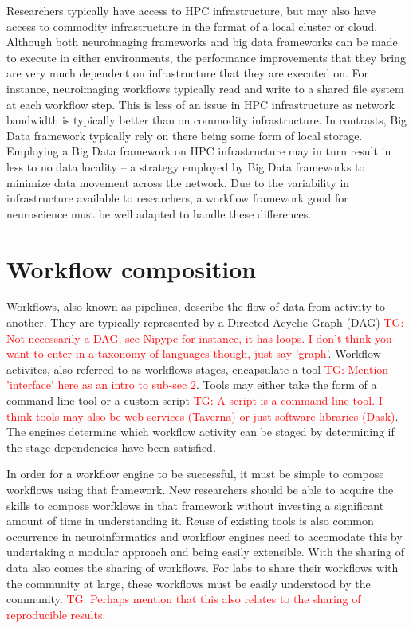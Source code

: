\documentclass{report}
\newcommand{\tristan}[1]{\textcolor{red}{TG: #1}}
\begin{document}
            Researchers typically have access to HPC infrastructure, but may
            also have access to commodity infrastructure in the format of a 
            local cluster or cloud. Although both neuroimaging frameworks and
            big data frameworks can be made to execute in either environments,
            the performance improvements that they bring are very much 
            dependent on infrastructure that they are executed on. For instance,
            neuroimaging workflows typically read and write to a shared file
            system at each workflow step. This is less of an issue in HPC 
            infrastructure as network bandwidth is typically better than on 
            commodity infrastructure. In contrasts, Big Data framework typically
            rely on there being some form of local storage. Employing a Big Data
            framework on HPC infrastructure may in turn result in less to no 
            data locality -- a strategy employed by Big Data frameworks to 
            minimize data movement across the network. Due to the variability in
            infrastructure available to researchers, a workflow framework good
            for neuroscience must be well adapted to handle these differences.

    \chapter{Workflow composition}\label{workcomp}

        Workflows, also known as pipelines, describe the flow of data from 
        activity to another. They are typically represented by a 
        Directed Acyclic Graph (DAG) \tristan{Not necessarily a DAG, see Nipype for instance, it has loops.
        I don't think you want to enter in a taxonomy of languages though, just say 'graph'}. Workflow activites, also referred to as 
        workflows stages, encapsulate a tool \tristan{Mention 'interface' here as an intro to sub-sec 2}. Tools may either take the form of 
        a command-line tool or a custom script \tristan{A script is a command-line tool. I think tools may also be web services (Taverna) or just 
        software libraries (Dask)}. The engines determine which
        workflow activity can be staged by determining if the stage dependencies
        have been satisfied.

        In order for a workflow engine to be successful, it must be simple to 
        compose workflows using that framework. New researchers should be able 
        to acquire the skills to compose worfklows in that framework without
        investing a significant amount of time in understanding it. Reuse of
        existing tools is also common occurrence in neuroinformatics and 
        workflow engines need to accomodate this by undertaking a modular 
        approach and being easily extensible. With the sharing of data also 
        comes the sharing of workflows. For labs to share their workflows with
        the community at large, these workflows must be easily understood by the
        community. \tristan{Perhaps mention that this also relates to the sharing
        of reproducible results}.
\end{document}
